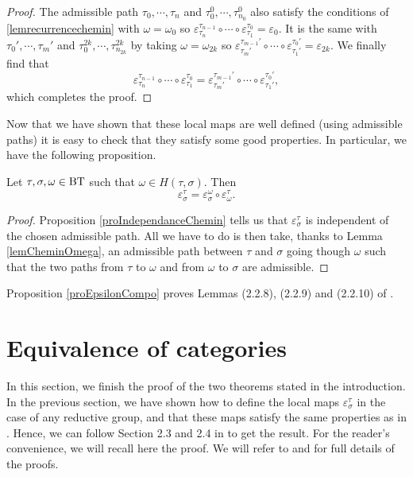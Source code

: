 \documentclass[a4paper,10pt]{amsart}
\begin{document}
\begin{proof}
\bigskip

The admissible path $\tau_{0},\cdots,\tau_{n}$ and $\tau_{0}^{0},\cdots,\tau_{n_{0}}^{0}$ also satisfy the conditions of \ref{lemrecurrencechemin} with $\omega = \omega_{0}$ so $\varepsilon^{\tau_{n-1}}_{\tau_{n}} \circ \cdots \circ \varepsilon_{\tau_{1}}^{\tau_{0}}=\varepsilon_0$. It is the same with $\tau_{0}',\cdots,\tau_{m}'$ and $\tau_{0}^{2k},\cdots,\tau_{n_{2k}}^{2k}$ by taking $\omega=\omega_{2k}$ so $\varepsilon^{\tau_{m-1}'}_{\tau_{m}'} \circ \cdots \circ \varepsilon_{\tau_{1}'}^{\tau_{0}'}=\varepsilon_{2k}$. We finally find that
\[\varepsilon^{\tau_{n-1}}_{\tau_{n}} \circ \cdots \circ \varepsilon_{\tau_{1}}^{\tau_{0}}=\varepsilon^{\tau_{m-1}'}_{\tau_{m}'} \circ \cdots \circ \varepsilon_{\tau_{1}'}^{\tau_{0}'},\]
which completes the proof.
\end{proof}

Now that we have shown that these local maps are well defined (using admissible paths) it is easy to check that they satisfy some good properties. In particular, we have the following proposition.

\begin{Pro}
\label{proEpsilonCompo}
Let $\tau,\sigma,\omega \in \bt$ such that $\omega \in H(\tau,\sigma)$. Then
\[ \varepsilon^{\tau}_{\sigma}=\varepsilon^{\omega}_{\sigma} \circ \varepsilon^{\tau}_{\omega}.\]
\end{Pro}

\begin{proof}
Proposition \ref{proIndependanceChemin} tells us that $\varepsilon^{\tau}_{\sigma}$ is independent of the chosen admissible path. All we have to do is then take, thanks to Lemma \ref{lemCheminOmega}, an admissible path between $\tau$ and $\sigma$ going though $\omega$ such that the two paths from $\tau$ to $\omega$ and from $\omega$ to $\sigma$ are admissible.
\end{proof}

\begin{Rem}
Proposition \ref{proEpsilonCompo} proves Lemmas (2.2.8), (2.2.9) and (2.2.10) of \cite{Wanga}.
\end{Rem}

\section{Equivalence of categories}

\label{seceqcat}

In this section, we finish the proof of the two theorems stated in the introduction. In the previous section, we have shown how to define the local maps $\varepsilon^{\tau}_{\sigma}$ in the case of any reductive group, and that these maps satisfy the same properties as in \cite{Wanga}. Hence, we can follow Section 2.3 and 2.4 in \cite{Wanga} to get the result. For the reader's convenience, we will recall here the proof. We will refer to \cite{Wanga} and \cite{meyer_resolutions_2010} for full details of the proofs.
\end{document}
